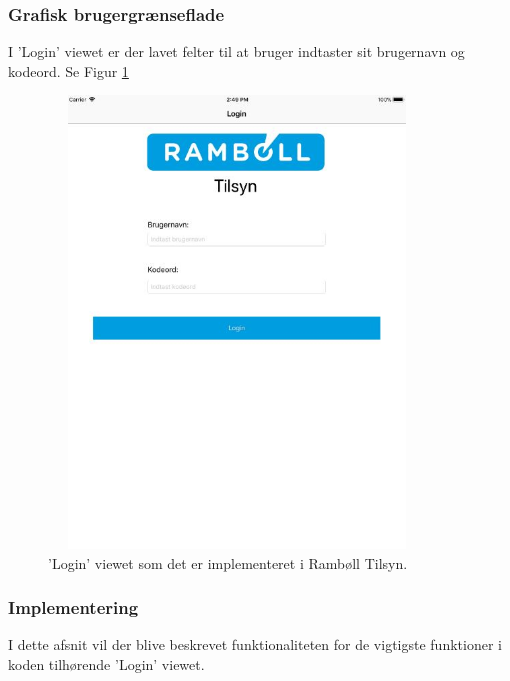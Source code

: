 \subsubsection{Grafisk brugergrænseflade}
I 'Login' viewet er der lavet felter til at bruger indtaster sit brugernavn og kodeord. Se Figur \ref{fig:LoginView}
\begin{figure}[H] %
	\centering
	\includegraphics[height=12cm, width=10cm]{../ArkitekturDesign/Design/Login/LoginView}
	\caption{'Login' viewet som det er implementeret i Rambøll Tilsyn.}
	\label{fig:LoginView}
\end{figure}

\clearpage

\subsubsection{Implementering}
I dette afsnit vil der blive beskrevet funktionaliteten for de vigtigste funktioner i koden tilhørende 'Login' viewet.

